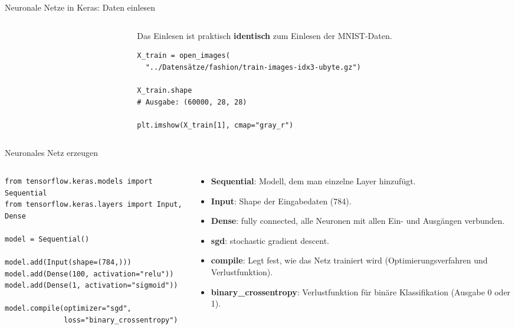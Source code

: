  \begin{frame}[fragile]{Neuronale Netze in Keras: Daten einlesen}
\begin{columns}
\begin{column}{0.3\textwidth}
\centering

\end{column}
\begin{column}{0.70\textwidth}
Das Einlesen ist praktisch \textbf{identisch} zum Einlesen der MNIST-Daten.

\vspace{0.5em}
\begin{verbatim}
X_train = open_images(
  "../Datensätze/fashion/train-images-idx3-ubyte.gz")

X_train.shape
# Ausgabe: (60000, 28, 28)

plt.imshow(X_train[1], cmap="gray_r")
\end{verbatim}
\end{column}
\end{columns}
\end{frame}




\begin{frame}[fragile]{Neuronales Netz erzeugen}
\begin{columns}
\begin{column}{0.57\textwidth}
\begin{verbatim}
from tensorflow.keras.models import Sequential
from tensorflow.keras.layers import Input, Dense

model = Sequential()

model.add(Input(shape=(784,)))
model.add(Dense(100, activation="relu"))
model.add(Dense(1, activation="sigmoid"))

model.compile(optimizer="sgd",
              loss="binary_crossentropy")
\end{verbatim}
\end{column}
\begin{column}{0.43\textwidth}
  \footnotesize
\begin{itemize}
\item \textbf{Sequential}: Modell, dem man einzelne Layer hinzufügt.
\item \textbf{Input}: Shape der Eingabedaten (784).
\item \textbf{Dense}: fully connected, alle Neuronen mit allen Ein- und Ausgängen verbunden.
\item \textbf{sgd}: stochastic gradient descent.
\item \textbf{compile}: Legt fest, wie das Netz trainiert wird (Optimierungsverfahren und Verlustfunktion).
\item \textbf{binary\_crossentropy}: Verlustfunktion für binäre Klassifikation (Ausgabe 0 oder 1).
\end{itemize}
\end{column}
\end{columns}
\end{frame}


